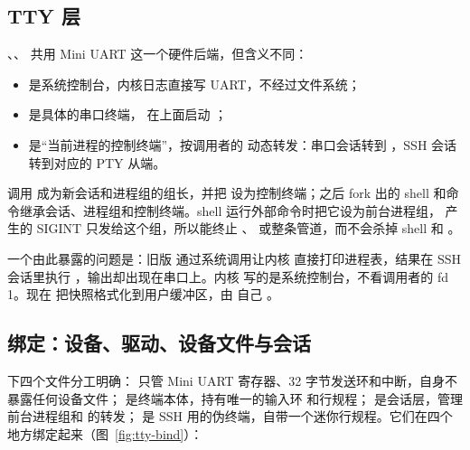 \subsection{TTY 层}

、、 共用 Mini UART 这一个硬件后端，但含义不同：

\begin{itemize}
  \item {} 是系统控制台，内核日志直接写 UART，不经过文件系统；
  \item {} 是具体的串口终端， 在上面启动 ；
  \item {} 是“当前进程的控制终端”，按调用者的  动态转发：串口会话转到 ，SSH 会话转到对应的 PTY 从端。
\end{itemize}

 调用  成为新会话和进程组的组长，并把  设为控制终端；之后 fork 出的 shell 和命令继承会话、进程组和控制终端。shell 运行外部命令时把它设为前台进程组， 产生的 SIGINT 只发给这个组，所以能终止 、 或整条管道，而不会杀掉 shell 和 。

一个由此暴露的问题是：旧版  通过系统调用让内核  直接打印进程表，结果在 SSH 会话里执行 ，输出却出现在串口上。内核  写的是系统控制台，不看调用者的 fd 1。现在  把快照格式化到用户缓冲区，由  自己 。

\subsection{绑定：设备、驱动、设备文件与会话}
\label{sec:tty-bind}

 下四个文件分工明确： 只管 Mini UART 寄存器、32 字节发送环和中断，自身不暴露任何设备文件； 是终端本体，持有唯一的输入环  和行规程； 是会话层，管理前台进程组和  的转发； 是 SSH 用的伪终端，自带一个迷你行规程。它们在四个地方绑定起来（图~\ref{fig:tty-bind}）：

